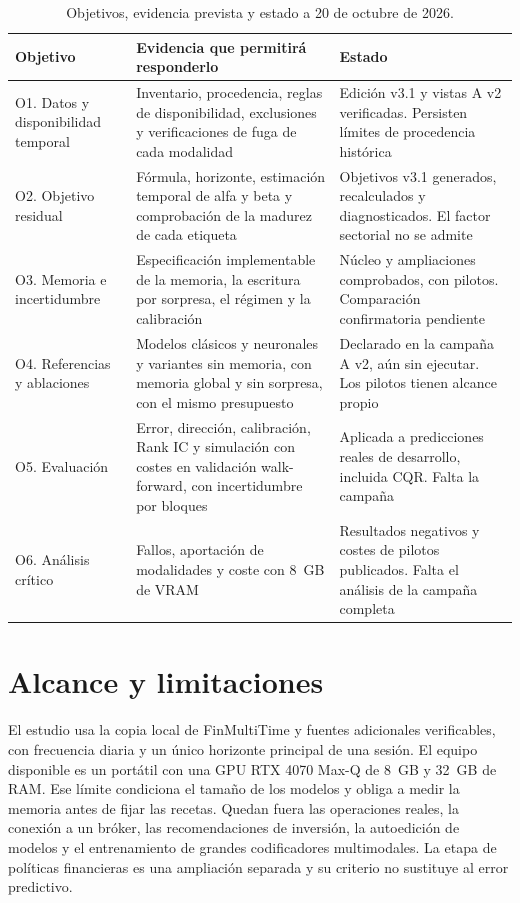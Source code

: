 \documentclass[11pt,a4paper]{report}
\begin{document}
\begin{table}[htbp]
\centering
\small
\caption{Objetivos, evidencia prevista y estado a 20 de octubre de 2026.}
\label{tab:objetivos}
\begin{tabular}{L{3.2cm}L{5.2cm}L{4.6cm}}
\toprule
Objetivo & Evidencia que permitirá responderlo & Estado \\
\midrule
O1. Datos y disponibilidad temporal & Inventario, procedencia, reglas de
disponibilidad, exclusiones y verificaciones de fuga de cada modalidad &
Edición v3.1 y vistas A v2 verificadas. Persisten límites de procedencia histórica
\\
O2. Objetivo residual & Fórmula, horizonte, estimación temporal de alfa y beta
y comprobación de la madurez de cada etiqueta & Objetivos v3.1 generados,
recalculados y diagnosticados. El factor sectorial no se admite \\
O3. Memoria e incertidumbre & Especificación implementable de la memoria, la
escritura por sorpresa, el régimen y la calibración & Núcleo y ampliaciones
comprobados, con pilotos. Comparación confirmatoria pendiente \\
O4. Referencias y ablaciones & Modelos clásicos y neuronales y variantes sin
memoria, con memoria global y sin sorpresa, con el mismo presupuesto & Declarado
en la campaña A v2, aún sin ejecutar. Los pilotos tienen alcance propio \\
O5. Evaluación & Error, dirección, calibración, Rank IC y simulación con
costes en validación walk-forward, con incertidumbre por bloques &
Aplicada a predicciones reales de desarrollo, incluida CQR. Falta la campaña \\
O6. Análisis crítico & Fallos, aportación de modalidades y coste con 8~GB de
VRAM & Resultados negativos y costes de pilotos publicados. Falta el análisis
de la campaña completa \\
\bottomrule
\end{tabular}
\end{table}

\section{Alcance y limitaciones}
El estudio usa la copia local de FinMultiTime y fuentes adicionales
verificables, con frecuencia diaria y un único horizonte principal de una
sesión. El equipo disponible es un portátil con una GPU RTX 4070 Max-Q de
8~GB y 32~GB de RAM. Ese límite condiciona el tamaño de los modelos y obliga
a medir la memoria antes de fijar las recetas. Quedan fuera las operaciones
reales, la conexión a un bróker, las recomendaciones de inversión, la
autoedición de modelos y el entrenamiento de grandes codificadores
multimodales. La etapa de políticas financieras es una ampliación separada y
su criterio no sustituye al error predictivo.
\end{document}
